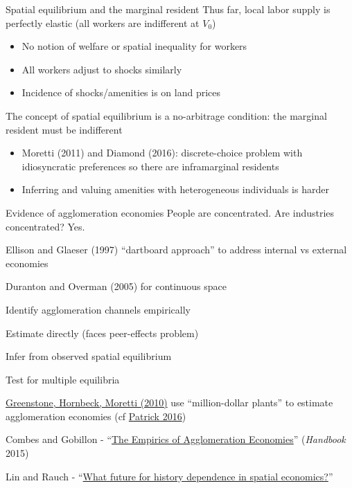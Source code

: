 \documentclass[11pt,notes=hide,aspectratio=169]{beamer}
\begin{document}
\begin{frame}{Spatial equilibrium and the marginal resident}
Thus far, local labor supply is perfectly elastic
(all workers are indifferent at $V_0$)
\begin{itemize}
\item No notion of welfare or spatial inequality for workers
\item All workers adjust to shocks similarly
\item Incidence of shocks/amenities is on land prices
\end{itemize}
\medskip
The concept of spatial equilibrium is a no-arbitrage condition:
the marginal resident must be indifferent
\begin{itemize}
\item Moretti (2011) and Diamond (2016): discrete-choice problem with idiosyncratic preferences so there are inframarginal residents
\item Inferring and valuing amenities with heterogeneous individuals is harder
\end{itemize}
\end{frame}
\begin{frame}{Evidence of agglomeration economies}
People are concentrated. Are industries concentrated? Yes.
\begin{itemize}{\small
	\item Ellison and Glaeser (1997) ``dartboard approach'' to address internal vs external economies
	\item Duranton and Overman (2005) for continuous space
}\end{itemize}
Identify agglomeration channels empirically
\begin{itemize}{\small
	\item Estimate directly (faces peer-effects problem)
	\item Infer from observed spatial equilibrium
	\item Test for multiple equilibria
	\item \href{https://www.journals.uchicago.edu/doi/abs/10.1086/653714}{Greenstone, Hornbeck, Moretti (2010)} use ``million-dollar plants'' to estimate agglomeration economies
  (cf \href{https://onlinelibrary.wiley.com/doi/abs/10.1111/ecin.12339}{Patrick 2016})
	\item Combes and Gobillon - ``\href{https://www.sciencedirect.com/science/article/pii/B9780444595171000052}{The Empirics of Agglomeration Economies}'' (\textit{Handbook} 2015)
	\item Lin and Rauch - ``\href{https://www.sciencedirect.com/science/article/pii/S0166046220303136}{What future for history dependence in spatial economics?}''
}\end{itemize}
\end{frame}
\end{document}
